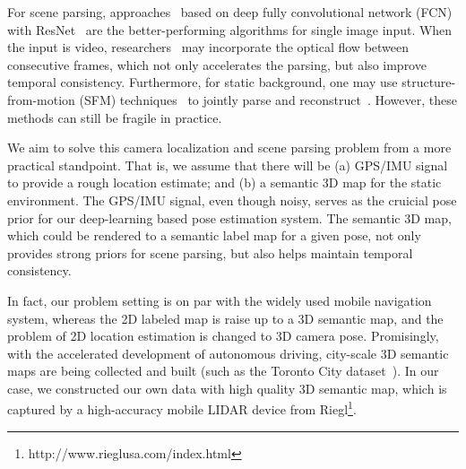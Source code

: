 For scene parsing, approaches~\cite{ZhaoSQWJ16,ChenPSA17} based on deep fully convolutional network (FCN) with ResNet~\cite{HeZRS15} are the better-performing algorithms for single image input. When the input is video, researchers~\cite{kundu2016feature,zhu2016deep} may incorporate the optical flow between consecutive frames, which not only accelerates the parsing, but also improve temporal consistency. Furthermore, for static background, one may use structure-from-motion (SFM) techniques~\cite{wu2011visualsfm} to jointly parse and reconstruct~\cite{kundu2014joint}. However, these methods can still be fragile in practice.

We aim to solve this camera localization and scene parsing problem from a more practical standpoint. That is, we assume that there will be (a) GPS/IMU signal to provide a rough location estimate; and (b) a semantic 3D map for the static environment. The GPS/IMU signal, even though noisy, serves as the cruicial pose prior for our deep-learning based pose estimation system. The semantic 3D map, which could be rendered to a semantic label map for a given pose, not only provides strong priors for scene parsing, but also helps maintain temporal consistency. 


%
In fact, our problem setting is on par with the widely used mobile navigation system, whereas the 2D labeled map is raise up to a 3D semantic map, and the problem of 2D location estimation is changed to 3D camera pose. Promisingly, with the accelerated development of autonomous driving, city-scale 3D semantic maps are being collected and built (such as the Toronto City dataset~\cite{wang2016torontocity}).  In our case, we constructed our own data with high quality 3D semantic map, which is captured by a high-accuracy mobile LIDAR device from Riegl\footnote{http://www.rieglusa.com/index.html}. 



